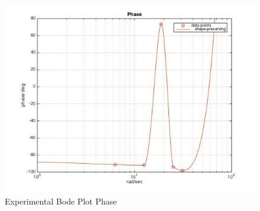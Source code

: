 \documentclass[11pt,titlepage]{article}
\begin{document}
		\begin{figure}[H]
			\centering
			\includegraphics[scale=0.6]{experimentalBodePhase}
			\caption{Experimental Bode Plot Phase}
		\end{figure}
\end{document}
